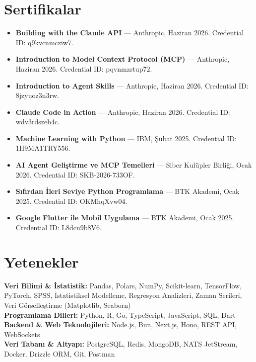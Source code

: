 \documentclass[10pt,a4paper]{extarticle}
\begin{document}
\section{Sertifikalar}
\begin{itemize}[leftmargin=*,noitemsep,topsep=2pt]
    \item \textbf{Building with the Claude API} --- Anthropic, Haziran 2026. Credential ID: q9kvcnmcziw7.
    \item \textbf{Introduction to Model Context Protocol (MCP)} --- Anthropic, Haziran 2026. Credential ID: pqvnmzrtup72.
    \item \textbf{Introduction to Agent Skills} --- Anthropic, Haziran 2026. Credential ID: 8jzyuoz3n3rw.
    \item \textbf{Claude Code in Action} --- Anthropic, Haziran 2026. Credential ID: wdv3rdszeb4c.
    \item \textbf{Machine Learning with Python} --- IBM, Şubat 2025. Credential ID: 1H9MA1TRY556.
    \item \textbf{AI Agent Geliştirme ve MCP Temelleri} --- Siber Kulüpler Birliği, Ocak 2026. Credential ID: SKB-2026-733OF.
    \item \textbf{Sıfırdan İleri Seviye Python Programlama} --- BTK Akademi, Ocak 2025. Credential ID: OKMhqXvw04.
    \item \textbf{Google Flutter ile Mobil Uygulama} --- BTK Akademi, Ocak 2025. Credential ID: L8dcn9b8V6.
\end{itemize}

\section{Yetenekler}
\textbf{Veri Bilimi \& İstatistik:} Pandas, Polars, NumPy, Scikit-learn, TensorFlow, PyTorch, SPSS, İstatistiksel Modelleme, Regresyon Analizleri, Zaman Serileri, Veri Görselleştirme (Matplotlib, Seaborn) \\
\textbf{Programlama Dilleri:} Python, R, Go, TypeScript, JavaScript, SQL, Dart \\
\textbf{Backend \& Web Teknolojileri:} Node.js, Bun, Next.js, Hono, REST API, WebSockets \\
\textbf{Veri Tabanı \& Altyapı:} PostgreSQL, Redis, MongoDB, NATS JetStream, Docker, Drizzle ORM, Git, Postman
\end{document}
